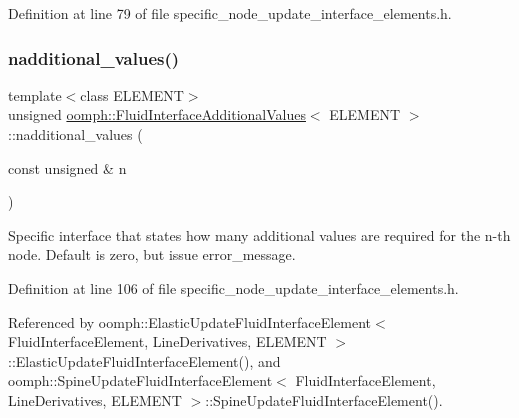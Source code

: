Definition at line 79 of file specific\+\_\+node\+\_\+update\+\_\+interface\+\_\+elements.\+h.

\mbox{\label{classoomph_1_1FluidInterfaceAdditionalValues_a20e916575114dcb64be896c777dbcbb8}} 
\subsubsection{\texorpdfstring{nadditional\+\_\+values()}{nadditional\_values()}}
{\footnotesize\ttfamily template$<$class E\+L\+E\+M\+E\+NT$>$ \\
unsigned \hyperlink{classoomph_1_1FluidInterfaceAdditionalValues}{oomph\+::\+Fluid\+Interface\+Additional\+Values}$<$ E\+L\+E\+M\+E\+NT $>$\+::nadditional\+\_\+values (\begin{DoxyParamCaption}\item[{const unsigned \&}]{n }\end{DoxyParamCaption})\hspace{0.3cm}{\ttfamily [inline]}}



Specific interface that states how many additional values are required for the n-\/th node. Default is zero, but issue error\+\_\+message. 



Definition at line 106 of file specific\+\_\+node\+\_\+update\+\_\+interface\+\_\+elements.\+h.



Referenced by oomph\+::\+Elastic\+Update\+Fluid\+Interface\+Element$<$ Fluid\+Interface\+Element, Line\+Derivatives, E\+L\+E\+M\+E\+N\+T $>$\+::\+Elastic\+Update\+Fluid\+Interface\+Element(), and oomph\+::\+Spine\+Update\+Fluid\+Interface\+Element$<$ Fluid\+Interface\+Element, Line\+Derivatives, E\+L\+E\+M\+E\+N\+T $>$\+::\+Spine\+Update\+Fluid\+Interface\+Element().

\mbox{\label{classoomph_1_1FluidInterfaceAdditionalValues_aaf63152daba918213fbd512e6d5a6c32}} 
